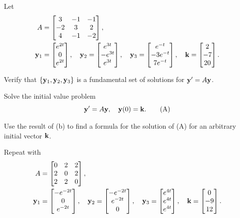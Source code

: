 \begin{exerciselist}
\item\label{exer:10.3.11}Let
\begin{align*}
 A&=\begin{bmatrix}3&-1&-1\\-2&3&2\\4&-1&-2\end{bmatrix}, \\
\mathbf{y}_1&=\begin{bmatrix} e^{2t} \\ 0 \\ e^{2t}\end{bmatrix}, \quad
\mathbf{y}_2=\begin{bmatrix} e^{3t} \\-e^{3t} \\e^{3t}\end{bmatrix}, \quad
\mathbf{y}_3=\begin{bmatrix} e^{-t} \\-3e^{-t} \\7e^{-t}\end{bmatrix}, \quad
\mathbf{k}=\begin{bmatrix}2 \\-7 \\ 20\end{bmatrix}.
\end{align*}

\begin{alist}
\item %
 Verify that $\{\mathbf{y}_1,\mathbf{y}_2,\mathbf{y}_3\}$
is a fundamental set of solutions for
$\mathbf{y}'=A\mathbf{y}$.

\item %
 Solve the initial value problem
\[
\mathbf{y}'=A\mathbf{y}, \quad   \mathbf{y}(0)=\mathbf{k}.\tag{A}
\]

\item %
Use the result of (b) to find a formula
for
 the solution of  (A)
for an arbitrary initial vector $\mathbf{k}$.
\end{alist}


\item\label{exer:10.3.12}Repeat  with
\begin{align*}
 A&=\begin{bmatrix}0&2&2\\2&0&2\\2&2&0\end{bmatrix}, \\
\mathbf{y}_1&=\begin{bmatrix}-e^{-2t} \\ 0 \\ e^{-2t}\end{bmatrix}, \quad
\mathbf{y}_2=\begin{bmatrix}-e^{-2t} \\ e^{-2t} \\0\end{bmatrix}, \quad
\mathbf{y}_3=\begin{bmatrix} e^{4t} \\ e^{4t} \\ e^{4t}\end{bmatrix}, \quad
\mathbf{k}=\begin{bmatrix} 0 \\-9 \\ 12\end{bmatrix}.
\end{align*}


\end{exerciselist}
